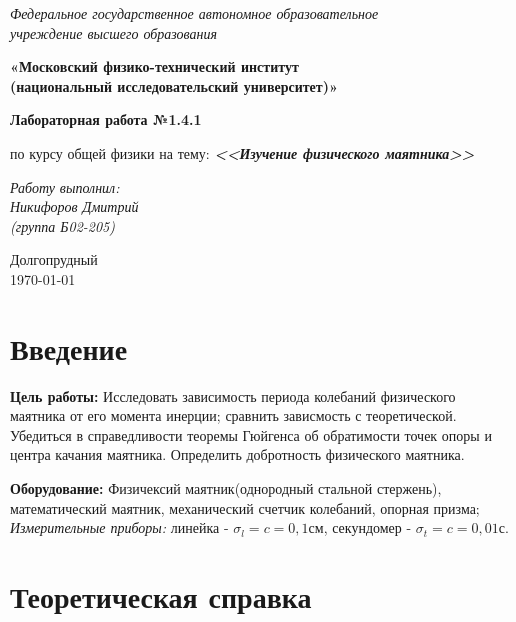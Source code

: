 \documentclass[a4paper,14pt]{extarticle}
\begin{document}
	\begin{center}
		\textit{Федеральное государственное автономное образовательное\\ учреждение высшего образования }
		
		\vspace{0.5ex}
		
		\textbf{«Московский физико-технический институт\\ (национальный исследовательский университет)»}
	\end{center}
	
	\vspace{10ex}
	
	
	\begin{center}
		\vspace{13ex}	
		\textbf{Лабораторная работа №1.4.1}	
		\vspace{1ex}
		
		по курсу общей физики		
		на тему:		
		\textbf{\textit{<<Изучение физического маятника>>}}		
		\vspace{30ex}
		
		\begin{flushright}
			\noindent
			\textit{Работу выполнил:}\\  
			\textit{Никифоров Дмитрий \\(группа Б02-205)}
		\end{flushright}
		\vfill
		Долгопрудный \\ \today
		
	\end{center}
	\newpage
	
	\section{Введение}
	
	\textbf{Цель работы:}
	Исследовать зависимость периода колебаний физического маятника от его момента инерции; сравнить зависмость с теоретической. Убедиться в справедливости теоремы Гюйгенса об обратимости точек опоры и центра качания маятника. Определить добротность физического маятника.
	
	\textbf{Оборудование:}
	Физичексий маятник(однородный стальной стержень), математический маятник, механический счетчик колебаний, опорная призма;\\
    \textit{Измерительные приборы:} линейка - $\sigma_l = c = 0,1 \text{см}$, секундомер - $\sigma_t = c = 0,01 \text{с}$.
    
    \section{Теоретическая справка}
    
\end{document}
